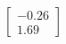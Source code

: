 \documentclass[preview]{standalone}
\begin{document}
\begin{align*}
\begin{bmatrix} -0.26 \\ 1.69 \end{bmatrix}
\end{align*}
\end{document}
